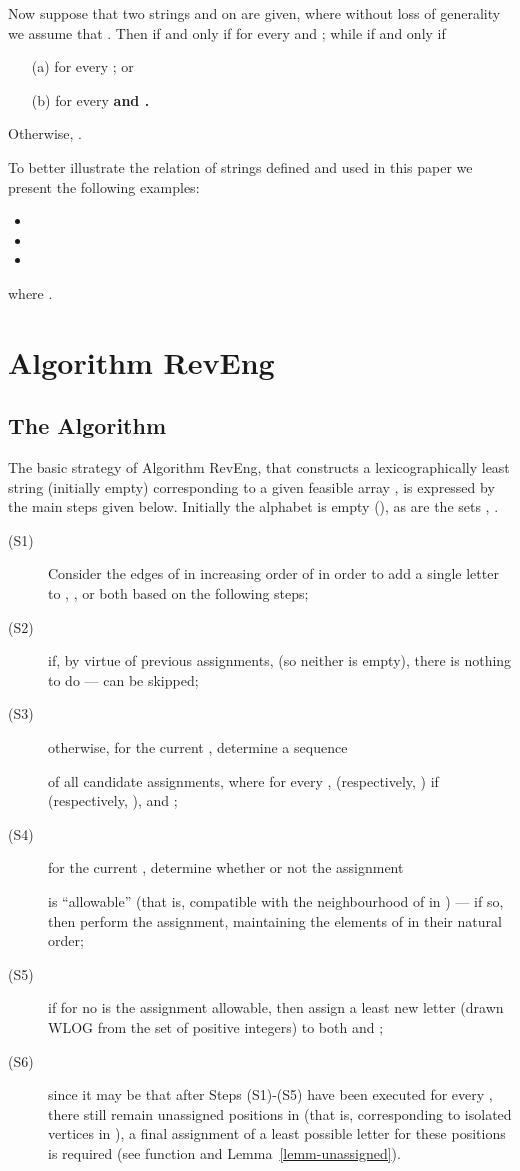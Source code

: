 \documentclass[runningheads,a4paper]{llncs}
\def\s#1{\mbox{\boldmath }}
\begin{document}
\begin{definition}
\label{wordorder}
Now suppose that two strings 
and  on  are given,
where without loss of generality we assume that .
Then  if and only if 
for every  and ; while
 if and only if
\begin{itemize}
\item[(a)]
 for every ; or
\item[(b)]
 for every  \bf{and}
.
\end{itemize}
Otherwise, .
\end{definition}

To better illustrate the relation of strings defined and used in this paper
we present the following examples:
\begin{itemize}
  \item 
  \item 
  \item 
\end{itemize}
where .
\section{Algorithm RevEng}
\label{sect-alg}

\subsection{The Algorithm}
The basic strategy of Algorithm RevEng, that constructs a lexicographically least
string \s{x} (initially empty)
corresponding to a given feasible array , is
expressed by the main steps given below.
Initially the alphabet  is empty (), as are the sets ,
.
\begin{description}
\item[(S1)]
Consider the edges  of  in increasing order of 
in order to add a single letter to , , or both based on the following steps;
\item[(S2)]
if, by virtue of previous assignments, 
(so neither is empty),
there is nothing to do ---  can be skipped;
\item[(S3)]
otherwise, for the current , determine a sequence

of all candidate assignments,
where for every ,  (respectively, )
if  (respectively, ),
and ;
\item[(S4)]
for the current , determine whether or not the assignment

is ``allowable'' (that is, compatible with
the neighbourhood of  in ) --- if so,
then perform the assignment,
maintaining the elements of  in their natural order;
\item[(S5)]
if for no  is the assignment allowable,
then assign a least new letter (drawn WLOG from the set of positive integers)
to both  and ;
\item[(S6)]
since it may be that after Steps (S1)-(S5) have been executed
for every , there still remain unassigned positions in \s{x}
(that is, corresponding to isolated vertices in ),
a final assignment of a least possible letter for these positions
is required (see function  and Lemma~\ref{lemm-unassigned}).
\end{description}
\end{document}
